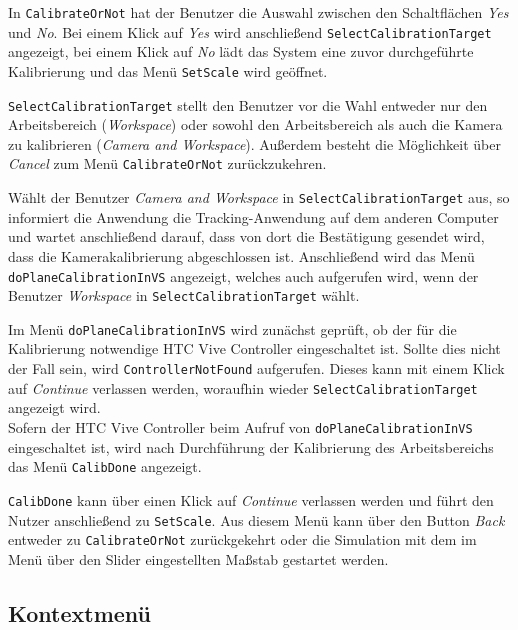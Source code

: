 In \texttt{CalibrateOrNot} hat der Benutzer die Auswahl zwischen den Schaltflächen \textit{Yes} und \textit{No}. Bei einem Klick auf \textit{Yes} wird anschließend \texttt{Select\-Calibration\-Target} angezeigt, bei einem Klick auf \textit{No} lädt das System eine zuvor durchgeführte Kalibrierung und das Menü \texttt{Set\-Scale} wird geöffnet.

\texttt{Select\-Calibration\-Target} stellt den Benutzer vor die Wahl entweder nur den Arbeitsbereich (\textit{Work\-space}) oder sowohl den Arbeitsbereich als auch die Kamera zu kalibrieren (\textit{Camera and Workspace}). Außerdem besteht die Möglichkeit über \textit{Cancel} zum Menü \texttt{Calibrate\-Or\-Not} zurückzukehren.

Wählt der Benutzer \textit{Camera and Workspace} in \texttt{Select\-Calibration\-Target} aus, so informiert die Anwendung die Tracking-Anwendung auf dem anderen Computer und wartet anschließend darauf, dass von dort die Bestätigung gesendet wird, dass die Kamerakalibrierung abgeschlossen ist. Anschließend wird das Menü \texttt{doPlane\-Calibration\-InVS} angezeigt, welches auch aufgerufen wird, wenn der Benutzer \textit{Work\-space} in \texttt{Select\-Calibration\-Target} wählt.

Im Menü \texttt{doPlane\-Calibration\-InVS} wird zunächst geprüft, ob der für die Kalibrierung notwendige HTC Vive Controller eingeschaltet ist. Sollte dies nicht der Fall sein, wird \texttt{Controller\-Not\-Found} aufgerufen. Dieses kann mit einem Klick auf \textit{Continue} verlassen werden, woraufhin wieder \texttt{Select\-Calibration\-Target} angezeigt wird.\\
Sofern der HTC Vive Controller beim Aufruf von \texttt{doPlane\-Calibration\-InVS} eingeschaltet ist, wird nach Durchführung der Kalibrierung des Arbeitsbereichs das Menü \texttt{CalibDone} angezeigt.

\texttt{Calib\-Done} kann über einen Klick auf \textit{Continue} verlassen werden und führt den Nutzer anschließend zu \texttt{SetScale}. Aus diesem Menü kann über den Button \textit{Back} entweder zu \texttt{CalibrateOrNot} zurückgekehrt oder die Simulation mit dem im Menü über den Slider eingestellten Maßstab gestartet werden.



\subsection{Kontextmenü}\label{sec:kontextMenu}

